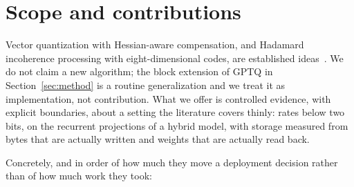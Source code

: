 \documentclass[11pt]{article}
\begin{document}
\section{Scope and contributions}

Vector quantization with Hessian-aware compensation, and Hadamard incoherence
processing with eight-dimensional codes, are established
ideas~\cite{gptvq,quipsharp,gptq,quip}. We do not claim a new algorithm; the
block extension of GPTQ in Section~\ref{sec:method} is a routine generalization
and we treat it as implementation, not contribution. What we offer is controlled
evidence, with explicit boundaries, about a setting the literature covers
thinly: rates below two bits, on the recurrent projections of a hybrid model,
with storage measured from bytes that are actually written and weights that are
actually read back.

Concretely, and in order of how much they move a deployment decision rather
than of how much work they took:
\end{document}
